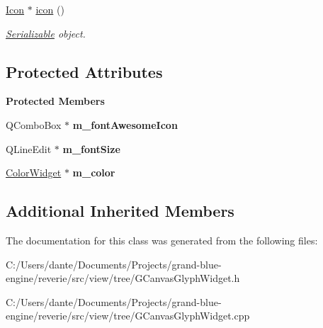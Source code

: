 \begin{Indent}
\begin{DoxyCompactItemize}
\mbox{\label{classrev_1_1_view_1_1_icon_widget_a297104c3b88419d7607e964ee4c845b4}} 
\mbox{\hyperlink{classrev_1_1_icon}{Icon}} $\ast$ \mbox{\hyperlink{classrev_1_1_view_1_1_icon_widget_a297104c3b88419d7607e964ee4c845b4}{icon}} ()
\begin{DoxyCompactList}\small\item\em \mbox{\hyperlink{classrev_1_1_serializable}{Serializable}} object. \end{DoxyCompactList}\end{DoxyCompactItemize}
\end{Indent}
\subsection*{Protected Attributes}
\begin{Indent}\textbf{ Protected Members}\par
\begin{DoxyCompactItemize}
\item 
\mbox{\label{classrev_1_1_view_1_1_icon_widget_aa90b5721b764abe5e585934a7247b2bf}} 
Q\+Combo\+Box $\ast$ {\bfseries m\+\_\+font\+Awesome\+Icon}
\item 
\mbox{\label{classrev_1_1_view_1_1_icon_widget_aa2928a393d7a8f10ebd89cc87accfea8}} 
Q\+Line\+Edit $\ast$ {\bfseries m\+\_\+font\+Size}
\item 
\mbox{\label{classrev_1_1_view_1_1_icon_widget_a73d7481a56563cb42b2607e018265c38}} 
\mbox{\hyperlink{classrev_1_1_view_1_1_color_widget}{Color\+Widget}} $\ast$ {\bfseries m\+\_\+color}
\end{DoxyCompactItemize}
\end{Indent}
\subsection*{Additional Inherited Members}


The documentation for this class was generated from the following files\+:\begin{DoxyCompactItemize}
\item 
C\+:/\+Users/dante/\+Documents/\+Projects/grand-\/blue-\/engine/reverie/src/view/tree/G\+Canvas\+Glyph\+Widget.\+h\item 
C\+:/\+Users/dante/\+Documents/\+Projects/grand-\/blue-\/engine/reverie/src/view/tree/G\+Canvas\+Glyph\+Widget.\+cpp\end{DoxyCompactItemize}
